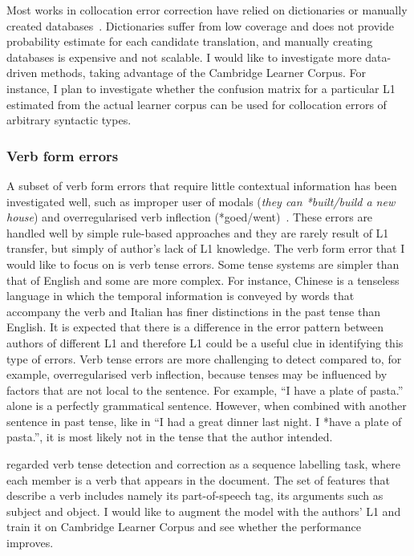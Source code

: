 \documentclass[11pt]{article}
\begin{document}
Most works in collocation error correction have relied on dictionaries or 
manually created databases~\citep{shei2000esl, wible2003bootstrapping, 
futagi2008computational}. Dictionaries suffer from low coverage and does not 
provide probability estimate for each candidate translation, and manually 
creating databases is expensive and not scalable. I would like to investigate 
more data-driven methods, taking advantage of the Cambridge Learner Corpus. For 
instance, I plan to investigate whether the confusion matrix for a particular L1 
estimated from the actual learner corpus can be used for collocation errors of 
arbitrary syntactic types.

\subsubsection{Verb form errors}
\label{subsub:verb}
A subset of verb form errors that require little contextual information has been 
investigated well, such as improper user of modals (\emph{they can *built/build 
a new house}) and overregularised verb inflection 
(*goed/went)~\citep{chodorow2000unsupervised, leacock2003automated}. These 
errors are handled well by simple rule-based approaches and they are rarely 
result of L1 transfer, but simply of author's lack of L1 knowledge. The verb 
form error that I would like to focus on is verb tense errors. Some tense 
systems are simpler than that of English and some are more complex. For 
instance, Chinese is a tenseless language in which the temporal information is 
conveyed by words that accompany the verb and Italian has finer distinctions in 
the past tense than English. It is expected that there is a difference in the 
error pattern between authors of different L1 and therefore L1 could be a useful 
clue in identifying this type of errors. Verb tense errors are more challenging 
to detect compared to, for example, overregularised verb inflection, because 
tenses may be influenced by factors that are not local to the sentence. For 
example, ``I have a plate of pasta.'' alone is a perfectly grammatical sentence. 
However, when combined with another sentence in past tense, like in ``I had a 
great dinner last night. I *have a plate of pasta.'', it is most likely not in 
the tense that the author intended.

\cite{tajiri2012tense} regarded verb tense detection and correction as a 
sequence labelling task, where each member is a verb that appears in the 
document. The set of features that describe a verb includes namely its 
part-of-speech tag, its arguments such as subject and object. I would like to 
augment the model with the authors' L1 and train it on Cambridge Learner Corpus 
and see whether the performance improves.
\end{document}
